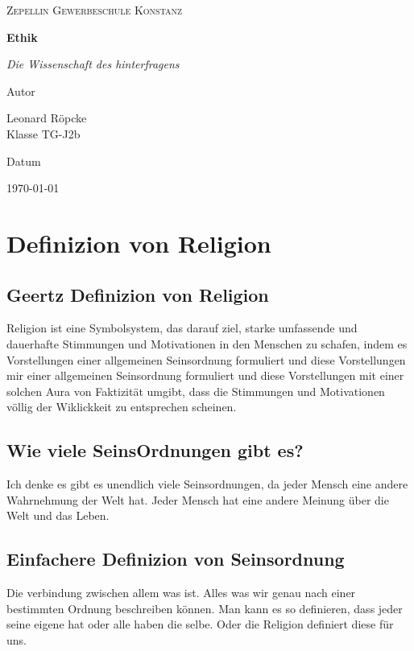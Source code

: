 \documentclass{article}
\newcommand{\AuthorName}{Leonard Röpcke\\Klasse TG-J2b}
\newcommand{\Institute}{Zepellin Gewerbeschule Konstanz}
\newcommand{\Subtitle}{Die Wissenschaft des hinterfragens}
\newcommand{\MyDate}{\today}
\begin{document}
\begin{titlepage}
  \centering
  {\scshape\LARGE \Institute \par}
  \vspace{2.5cm}
  {\huge\bfseries Ethik\par}
  \vspace{0.8cm}
  {\Large\itshape \Subtitle \par}
  \vfill
  {\Large Autor\par}
  {\Large \AuthorName \par}
  \vspace{1cm}
  {\Large Datum\par}
  {\Large \MyDate \par}
  \vfill
  \vspace{1cm}
  {\small }
\end{titlepage}
\tableofcontents
\newpage

\section{Definizion von Religion}

\subsection{Geertz Definizion von Religion}
Religion ist eine Symbolsystem, das darauf ziel, 
starke umfassende und dauerhafte Stimmungen und Motivationen
 in den Menschen zu schafen, indem es Vorstellungen einer allgemeinen 
 Seinsordnung formuliert und diese Vorstellungen mir einer allgemeinen
  Seinsordnung formuliert und diese Vorstellungen mit einer solchen Aura 
  von Faktizität umgibt, dass die Stimmungen und Motivationen völlig der 
  Wiklickkeit zu entsprechen scheinen.

\subsection{Wie viele SeinsOrdnungen gibt es?}
Ich denke es gibt es unendlich viele Seinsordnungen, da jeder Mensch eine andere Wahrnehmung der Welt hat.
Jeder Mensch hat eine andere Meinung über die Welt und das Leben.

\subsection{Einfachere Definizion von Seinsordnung}
Die verbindung zwischen allem was ist. Alles was wir genau nach einer bestimmten Ordnung beschreiben können.
Man kann es so definieren, dass jeder seine eigene hat oder alle haben die selbe. Oder die Religion definiert diese für uns.
\end{document}
